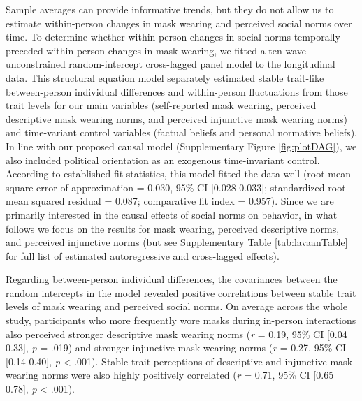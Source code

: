 \documentclass[
  man, donotrepeattitle,mask,floatsintext]{apa6}
\begin{document}
Sample averages can provide informative trends, but they do not allow us to estimate within-person changes in mask wearing and perceived social norms over time. To determine whether within-person changes in social norms temporally preceded within-person changes in mask wearing, we fitted a ten-wave unconstrained random-intercept cross-lagged panel model to the longitudinal data. This structural equation model separately estimated stable trait-like between-person individual differences and within-person fluctuations from those trait levels for our main variables (self-reported mask wearing, perceived descriptive mask wearing norms, and perceived injunctive mask wearing norms) and time-variant control variables (factual beliefs and personal normative beliefs). In line with our proposed causal model (Supplementary Figure \ref{fig:plotDAG}), we also included political orientation as an exogenous time-invariant control. According to established fit statistics, this model fitted the data well (root mean square error of approximation = 0.030, 95\% CI {[}0.028 0.033{]}; standardized root mean squared residual = 0.087; comparative fit index = 0.957). Since we are primarily interested in the causal effects of social norms on behavior, in what follows we focus on the results for mask wearing, perceived descriptive norms, and perceived injunctive norms (but see Supplementary Table \ref{tab:lavaanTable} for full list of estimated autoregressive and cross-lagged effects).

Regarding between-person individual differences, the covariances between the random intercepts in the model revealed positive correlations between stable trait levels of mask wearing and perceived social norms. On average across the whole study, participants who more frequently wore masks during in-person interactions also perceived stronger descriptive mask wearing norms (\emph{r} = 0.19, 95\% CI {[}0.04 0.33{]}, \emph{p} = .019) and stronger injunctive mask wearing norms (\emph{r} = 0.27, 95\% CI {[}0.14 0.40{]}, \emph{p} \textless{} .001). Stable trait perceptions of descriptive and injunctive mask wearing norms were also highly positively correlated (\emph{r} = 0.71, 95\% CI {[}0.65 0.78{]}, \emph{p} \textless{} .001).
\end{document}
